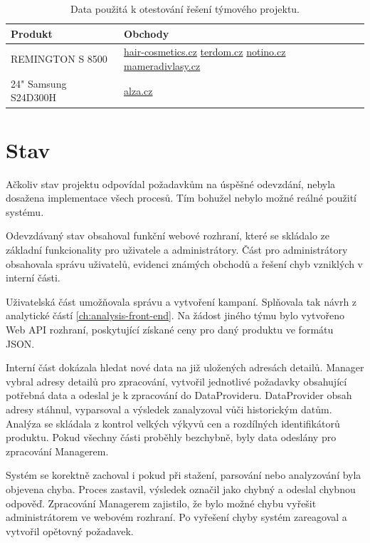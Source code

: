 \documentclass[thesis=B,czech]{FITthesis}[2012/06/26]
\begin{document}
\begin{table}[h]\centering
    \begin{tabular}{ | l | p{7cm} |}
    \hline
    Produkt & Obchody \\ \hline
    REMINGTON S 8500 &
    	\href{https://www.hair-cosmetics.cz}{hair-cosmetics.cz}\newline
    	\href{https://www.terdom.cz}{terdom.cz}\newline
    	\href{https://www.notino.cz}{notino.cz}\newline
    	\href{https://www.mameradivlasy.cz}{mameradivlasy.cz}\newline
    \\ \hline
    24" Samsung S24D300H & 
    	\href{https://www.alza.cz}{alza.cz} \\ \hline
    \end{tabular}
	\caption{Data použitá k otestování řešení týmového projektu.}
	  \label{table:testing-data-1}
\end{table}

\section{Stav}
Ačkoliv stav projektu odpovídal požadavkům na úspěšné odevzdání, nebyla dosažena implementace všech procesů. 
Tím bohužel nebylo možné reálné použití systému.
\par
Odevzdávaný stav obsahoval funkční webové rozhraní, které se skládalo ze základní funkcionality pro uživatele a administrátory.
Část pro administrátory obsahovala správu uživatelů, evidenci známých obchodů a řešení chyb vzniklých v interní části.
\par
Uživatelská část umožňovala správu a vytvoření kampaní. Splňovala tak návrh z analytické částí \ref{ch:analysis-front-end}.
Na žádost jiného týmu bylo vytvořeno Web API rozhraní, poskytující získané ceny pro daný produktu ve formátu JSON.
\par
Interní část dokázala hledat nové data na již uložených adresách detailů. Manager vybral adresy detailů pro zpracování, vytvořil
jednotlivé požadavky obsahující potřebná data a odeslal je k zpracování do DataProvideru. DataProvider obsah adresy stáhnul, vyparsoval a výsledek zanalyzoval vůči historickým datům. Analýza se skládala z kontrol velkých výkyvů cen a rozdílných identifikátorů produktu. Pokud všechny části proběhly bezchybně, byly data odeslány pro zpracování Managerem.
\par
Systém se korektně zachoval i pokud při stažení, parsování nebo analyzování byla objevena chyba. Proces zastavil, výsledek označil jako chybný
a odeslal chybnou odpověď. Zpracování Managerem zajistilo, že bylo možné chybu vyřešit administrátorem ve webovém rozhraní. Po vyřešení chyby systém zareagoval a vytvořil opětovný požadavek.
\end{document}
